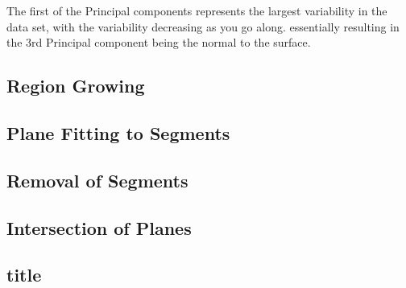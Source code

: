		The first of the Principal components represents the largest variability in the data set, with the variability decreasing as you go along. essentially resulting in the 3rd Principal component being the normal to the surface.
		
	\subsection{Region Growing}
	
	\subsection{Plane Fitting to Segments}
	
	\subsection{Removal of Segments}
	
	\subsection{Intersection of Planes}
	
	\subsection{title}
		
		
		
		
		
		
		
		
		
		